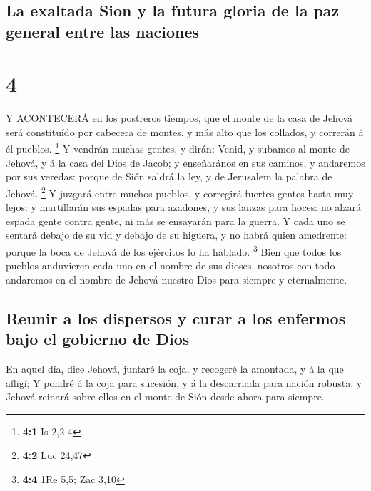 \hypertarget{la-exaltada-sion-y-la-futura-gloria-de-la-paz-general-entre-las-naciones}{%
\subsection{La exaltada Sion y la futura gloria de la paz general entre
las
naciones}\label{la-exaltada-sion-y-la-futura-gloria-de-la-paz-general-entre-las-naciones}}

\hypertarget{section-3}{%
\section{4}\label{section-3}}

 Y ACONTECERÁ en los postreros tiempos, que el monte de la
casa de Jehová será constituído por cabecera de montes, y más alto que
los collados, y correrán á él pueblos. \footnote{\textbf{4:1} Is 2,2-4}
 Y vendrán muchas gentes, y dirán: Venid, y subamos al monte
de Jehová, y á la casa del Dios de Jacob; y enseñarános en sus caminos,
y andaremos por sus veredas: porque de Sión saldrá la ley, y de
Jerusalem la palabra de Jehová. \footnote{\textbf{4:2} Luc 24,47}
 Y juzgará entre muchos pueblos, y corregirá fuertes gentes
hasta muy lejos: y martillarán sus espadas para azadones, y sus lanzas
para hoces: no alzará espada gente contra gente, ni más se ensayarán
para la guerra.  Y cada uno se sentará debajo de su vid y
debajo de su higuera, y no habrá quien amedrente: porque la boca de
Jehová de los ejércitos lo ha hablado. \footnote{\textbf{4:4} 1Re 5,5;
  Zac 3,10}  Bien que todos los pueblos anduvieren cada uno
en el nombre de sus dioses, nosotros con todo andaremos en el nombre de
Jehová nuestro Dios para siempre y eternalmente.

\hypertarget{reunir-a-los-dispersos-y-curar-a-los-enfermos-bajo-el-gobierno-de-dios}{%
\subsection{Reunir a los dispersos y curar a los enfermos bajo el
gobierno de
Dios}\label{reunir-a-los-dispersos-y-curar-a-los-enfermos-bajo-el-gobierno-de-dios}}

 En aquel día, dice Jehová, juntaré la coja, y recogeré la
amontada, y á la que afligí;  Y pondré á la coja para
sucesión, y á la descarriada para nación robusta: y Jehová reinará sobre
ellos en el monte de Sión desde ahora para siempre.

